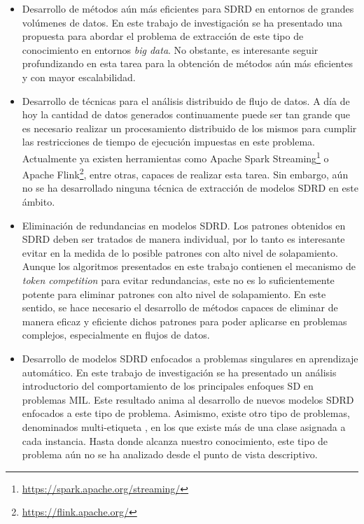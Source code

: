 \documentclass[c5paper,10pt,twoside]{book}	   	%
\begin{document}
\begin{itemize}
	
	\item Desarrollo de métodos aún más eficientes para \ac{SDRD} en entornos de grandes volúmenes de datos. En este trabajo de investigación se ha presentado una propuesta para abordar el problema de extracción de este tipo de conocimiento en entornos \textit{big data}. No obstante, es interesante seguir profundizando en esta tarea para la obtención de métodos aún más eficientes y con mayor escalabilidad. 

	\item Desarrollo de técnicas para el análisis distribuido de flujo de datos. A día de hoy la cantidad de datos generados continuamente puede ser tan grande que es necesario realizar un procesamiento distribuido de los mismos para cumplir las restricciones de tiempo de ejecución impuestas en este problema. Actualmente ya existen herramientas como Apache Spark Streaming\footnote{\url{https://spark.apache.org/streaming/}} o Apache Flink\footnote{\url{https://flink.apache.org/}}, entre otras, capaces de realizar esta tarea. Sin embargo, aún no se ha desarrollado ninguna técnica de extracción de modelos SDRD en este ámbito.
	
	\item Eliminación de redundancias en modelos \ac{SDRD}. Los patrones obtenidos en \ac{SDRD} deben ser tratados de manera individual, por lo tanto es interesante evitar en la medida de lo posible patrones con alto nivel de solapamiento. Aunque los algoritmos presentados en este trabajo contienen el mecanismo de \textit{token competition} para evitar redundancias, este no es lo suficientemente potente para eliminar patrones con alto nivel de solapamiento. En este sentido, se hace necesario el desarrollo de métodos capaces de eliminar de manera eficaz y eficiente dichos patrones para poder aplicarse en problemas complejos, especialmente en flujos de datos.
	
	\item Desarrollo de modelos \ac{SDRD} enfocados a problemas singulares en aprendizaje automático. En este trabajo de investigación se ha presentado un análisis introductorio del comportamiento de los principales enfoques \ac{SD} en problemas \ac{MIL}. Este resultado anima al desarrollo de nuevos modelos \ac{SDRD} enfocados a este tipo de problema. Asimismo, existe otro tipo de problemas, denominados multi-etiqueta \cite{herrera2016multilabel}, en los que existe más de una clase asignada a cada instancia. Hasta donde alcanza nuestro conocimiento, este tipo de problema aún no se ha analizado desde el punto de vista descriptivo.




\end{itemize}
\end{document}
